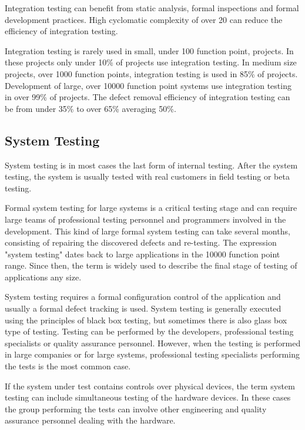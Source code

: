 Integration testing can benefit from static analysis, formal inspections and formal development practices. High cyclomatic complexity of over 20 can reduce the efficiency of integration testing. 

Integration testing is rarely used in small, under 100 function point, projects. In these projects only under 10\% of projects use integration testing. In medium size projects, over 1000 function points, integration testing is used in 85\% of projects. Development of large, over 10000 function point systems use integration testing in over 99\% of projects. The defect removal efficiency of integration testing can be from under 35\% to over 65\% averaging 50\%. 

 \subsection{System Testing}

System testing is in most cases the last form of internal testing. After the system testing, the system is usually tested with real customers in field testing or beta testing. 

Formal system testing for large systems is a critical testing stage and can require large teams of professional testing personnel and programmers involved in the development. This kind of large formal system testing can take several months, consisting of repairing the discovered defects and re-testing. The expression "system testing" dates back to large applications in the 10000 function point range. Since then, the term is widely used to describe the final stage of testing of applications any size. 

System testing requires a formal configuration control of the application and usually a formal defect tracking is used. System testing is generally executed using the principles of black box testing, but sometimes there is also glass box type of testing. Testing can be performed by the developers, professional testing specialists or quality assurance personnel. However, when the testing is performed in large companies or for large systems, professional testing specialists performing the tests is the most common case.

If the system under test contains controls over physical devices, the term system testing can include simultaneous testing of the hardware devices. In these cases the group performing the tests can involve other engineering and quality assurance personnel dealing with the hardware.

